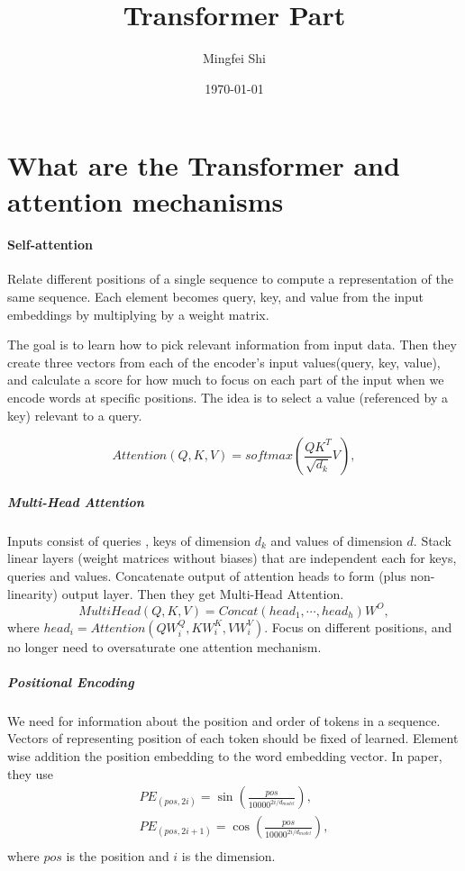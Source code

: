 \documentclass[11pt]{article}
\author{Mingfei Shi}
\title{Transformer Part}
\date{\today}
\begin{document}
    \maketitle
    \newpage
\section{What are the Transformer and attention mechanisms}\label{sec:what-are-the-transformer-and-attention-mechanisms}

\paragraph{Self-attention} Relate different positions of a single sequence to compute a representation of the same sequence.
    Each element becomes query, key, and value from the input embeddings by multiplying by a weight matrix.

    The goal is to learn how to pick relevant information from input data.
    Then they create three vectors from each of the encoder's input values(query, key, value), and calculate a score for how much
    to focus on each part of the input when we encode words at specific positions.
    The idea is to select a value (referenced by a key) relevant to a query.

    \[Attention(Q, K, V) = softmax\left(\frac{QK^T}{\sqrt {d_k}}V\right),\]
    \subparagraph{Multi-Head Attention} Inputs consist of queries , keys of dimension $d_k$ and values of dimension $d$.
    Stack linear layers (weight matrices without biases) that are independent each for keys, queries and values.
    Concatenate output of attention heads to form (plus non-linearity) output layer.
    Then they get Multi-Head Attention.
    \[MultiHead(Q, K, V) = Concat(head_1, \cdots, head_h)W^O,\]
    where $head_i = Attention(QW_i^Q, KW_i^K, VW_i^V).$
    Focus on different positions, and no longer need to oversaturate one attention mechanism.

    \subparagraph{Positional Encoding} We need for information about the position and order of tokens in a sequence.
    Vectors of representing position of each token should be fixed of learned.
    Element wise addition the position embedding to the word embedding vector.
    In paper, they use
    \begin{gather*}
        PE_{(pos, 2i)} = \sin\left(\frac{pos}{10000^{2i/d_{model}}}\right),\\
        PE_{(pos, 2i+1)} = \cos\left(\frac{pos}{10000^{2i/d_{model}}}\right),\\
    \end{gather*}
    where $pos$ is the position and $i$ is the dimension.
    
\end{document}
